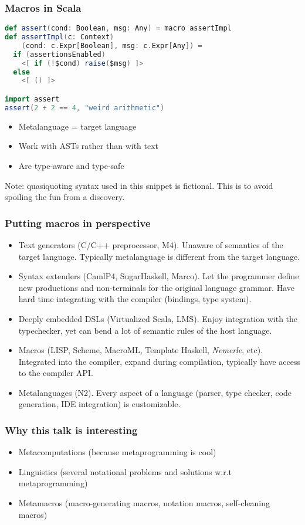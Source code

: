 \documentclass[hyperref={bookmarks=false}]{beamer}
\begin{document}
\begin{frame}[fragile]
\frametitle{Macros in Scala}
\begin{lstlisting}[language=scala]
def assert(cond: Boolean, msg: Any) = macro assertImpl
def assertImpl(c: Context)
    (cond: c.Expr[Boolean], msg: c.Expr[Any]) =
  if (assertionsEnabled)
    <[ if (!$cond) raise($msg) ]>
  else
    <[ () ]>

import assert
assert(2 + 2 == 4, "weird arithmetic")
\end{lstlisting}

\begin{itemize}
\item Metalanguage = target language
\item Work with ASTs rather than with text
\item Are type-aware and type-safe
\end{itemize}

Note: quasiquoting syntax used in this snippet is fictional. This is to avoid spoiling the fun from a discovery.
\end{frame}

\begin{frame}[fragile]
\frametitle{Putting macros in perspective}
\begin{itemize}
\item Text generators (C/C++ preprocessor, M4). Unaware of semantics of the target language. Typically metalanguage is different from the target language.
\item Syntax extenders (CamlP4, SugarHaskell, Marco). Let the programmer define new productions and non-terminals for the original language grammar. Have hard time integrating with the compiler (bindings, type system).
\item Deeply embedded DSLs (Virtualized Scala, LMS). Enjoy integration with the typechecker, yet can bend a lot of semantic rules of the host language.
\item Macros (LISP, Scheme, MacroML, Template Haskell, \emph{Nemerle}, etc). Integrated into the compiler, expand during compilation, typically have access to the compiler API.
\item Metalanguages (N2). Every aspect of a language (parser, type checker, code generation, IDE integration) is customizable.
\end{itemize}
\end{frame}

\begin{frame}[fragile]
\frametitle{Why this talk is interesting}
\begin{itemize}
\item Metacomputations (because metaprogramming is cool)
\item Linguistics (several notational problems and solutions w.r.t metaprogramming)
\item Metamacros (macro-generating macros, notation macros, self-cleaning macros)
\end{itemize}
\end{frame}
\end{document}
